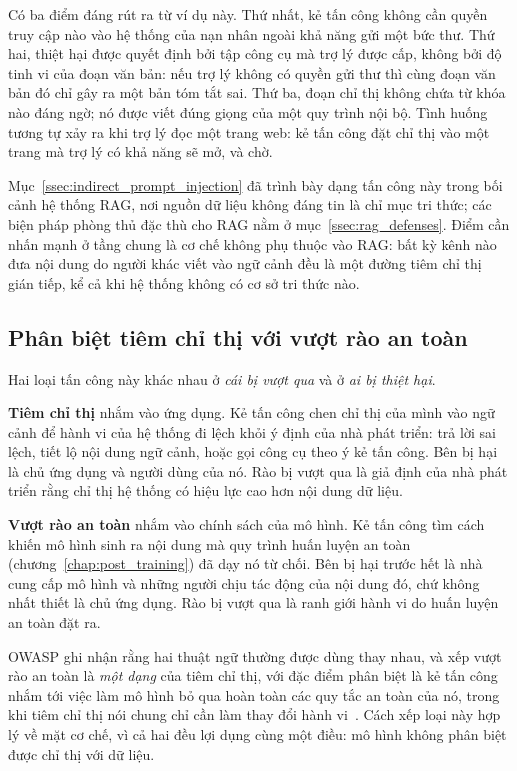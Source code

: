Có ba điểm đáng rút ra từ ví dụ này. Thứ nhất, kẻ tấn công không cần quyền truy cập nào vào hệ thống của nạn nhân ngoài khả năng gửi một bức thư. Thứ hai, thiệt hại được quyết định bởi tập công cụ mà trợ lý được cấp, không bởi độ tinh vi của đoạn văn bản: nếu trợ lý không có quyền gửi thư thì cùng đoạn văn bản đó chỉ gây ra một bản tóm tắt sai. Thứ ba, đoạn chỉ thị không chứa từ khóa nào đáng ngờ; nó được viết đúng giọng của một quy trình nội bộ. Tình huống tương tự xảy ra khi trợ lý đọc một trang web: kẻ tấn công đặt chỉ thị vào một trang mà trợ lý có khả năng sẽ mở, và chờ.

Mục~\ref{ssec:indirect_prompt_injection} đã trình bày dạng tấn công này trong bối cảnh hệ thống RAG, nơi nguồn dữ liệu không đáng tin là chỉ mục tri thức; các biện pháp phòng thủ đặc thù cho RAG nằm ở mục~\ref{ssec:rag_defenses}. Điểm cần nhấn mạnh ở tầng chung là cơ chế không phụ thuộc vào RAG: bất kỳ kênh nào đưa nội dung do người khác viết vào ngữ cảnh đều là một đường tiêm chỉ thị gián tiếp, kể cả khi hệ thống không có cơ sở tri thức nào.

\subsection{Phân biệt tiêm chỉ thị với vượt rào an toàn}
\label{ssec:injection_vs_jailbreak}

Hai loại tấn công này khác nhau ở \emph{cái bị vượt qua} và ở \emph{ai bị thiệt hại}.

\textbf{Tiêm chỉ thị} nhắm vào ứng dụng. Kẻ tấn công chen chỉ thị của mình vào ngữ cảnh để hành vi của hệ thống đi lệch khỏi ý định của nhà phát triển: trả lời sai lệch, tiết lộ nội dung ngữ cảnh, hoặc gọi công cụ theo ý kẻ tấn công. Bên bị hại là chủ ứng dụng và người dùng của nó. Rào bị vượt qua là giả định của nhà phát triển rằng chỉ thị hệ thống có hiệu lực cao hơn nội dung dữ liệu.

\textbf{Vượt rào an toàn} nhắm vào chính sách của mô hình. Kẻ tấn công tìm cách khiến mô hình sinh ra nội dung mà quy trình huấn luyện an toàn (chương~\ref{chap:post_training}) đã dạy nó từ chối. Bên bị hại trước hết là nhà cung cấp mô hình và những người chịu tác động của nội dung đó, chứ không nhất thiết là chủ ứng dụng. Rào bị vượt qua là ranh giới hành vi do huấn luyện an toàn đặt ra.

OWASP ghi nhận rằng hai thuật ngữ thường được dùng thay nhau, và xếp vượt rào an toàn là \emph{một dạng} của tiêm chỉ thị, với đặc điểm phân biệt là kẻ tấn công nhắm tới việc làm mô hình bỏ qua hoàn toàn các quy tắc an toàn của nó, trong khi tiêm chỉ thị nói chung chỉ cần làm thay đổi hành vi~\cite{owasp2025llmtop10}. Cách xếp loại này hợp lý về mặt cơ chế, vì cả hai đều lợi dụng cùng một điều: mô hình không phân biệt được chỉ thị với dữ liệu.

